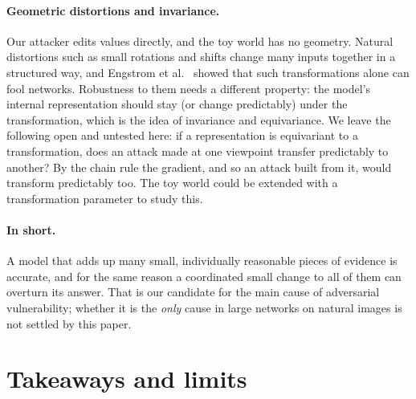 \documentclass[11pt]{article}
\begin{document}
\paragraph{Geometric distortions and invariance.} Our attacker edits values directly, and the toy world has no geometry. Natural distortions such as small rotations and shifts change many inputs together in a structured way, and Engstrom et al.~\cite{engstrom2019} showed that such transformations alone can fool networks. Robustness to them needs a different property: the model's internal representation should stay (or change predictably) under the transformation, which is the idea of invariance and equivariance. We leave the following open and untested here: if a representation is equivariant to a transformation, does an attack made at one viewpoint transfer predictably to another? By the chain rule the gradient, and so an attack built from it, would transform predictably too. The toy world could be extended with a transformation parameter to study this.

\paragraph{In short.} A model that adds up many small, individually reasonable pieces of evidence is accurate, and for the same reason a coordinated small change to all of them can overturn its answer. That is our candidate for the main cause of adversarial vulnerability; whether it is the \emph{only} cause in large networks on natural images is not settled by this paper.

\section{Takeaways and limits}
\end{document}
